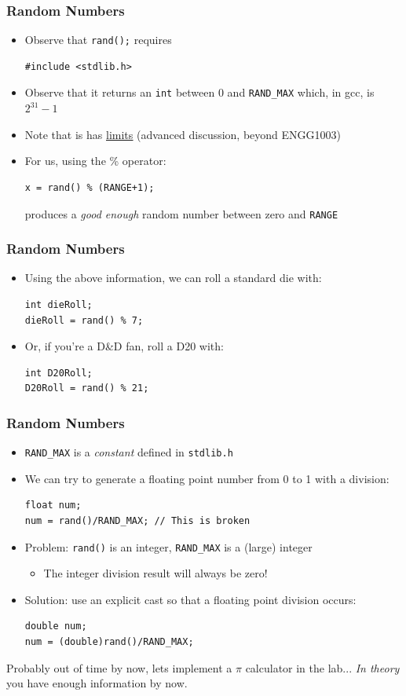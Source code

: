\documentclass[14pt]{beamer}
\begin{document}
\begin{frame}[fragile]
\frametitle{Random Numbers}
\begin{itemize}
\item Observe that \texttt{rand();} requires 
\begin{lstlisting}[style=CStyle]
#include <stdlib.h>
\end{lstlisting}
\item Observe that it returns an \texttt{int} between 0 and \texttt{RAND\_MAX} which, in gcc, is $2^{31}-1$
\item Note that is has \underline{\href{http://www.azillionmonkeys.com/qed/random.html}{limits}} (advanced discussion, beyond ENGG1003)
\item For us, using the \% operator:
\begin{lstlisting}[style=CStyle]
x = rand() % (RANGE+1);
\end{lstlisting}
produces a \textit{good enough} random number between zero and \texttt{RANGE}
\end{itemize}
\end{frame}

\begin{frame}[fragile]
\frametitle{Random Numbers}
\begin{itemize}
\item Using the above information, we can roll a standard die with:
\begin{lstlisting}[style=CStyle]
int dieRoll;
dieRoll = rand() % 7;
\end{lstlisting}
\item Or, if you're a D\&D fan, roll a D20 with:
\begin{lstlisting}[style=CStyle]
int D20Roll;
D20Roll = rand() % 21;
\end{lstlisting}
\end{itemize}
\end{frame}


\begin{frame}[fragile]
\frametitle{Random Numbers}
\begin{itemize}
\item \texttt{RAND\_MAX} is a \textit{constant} defined in \texttt{stdlib.h}
\item We can try to generate a floating point number from 0 to 1 with a division:
\begin{lstlisting}[style=CStyle]
float num;
num = rand()/RAND_MAX; // This is broken
\end{lstlisting}
\item Problem: \texttt{rand()} is an integer, \texttt{RAND\_MAX} is a (large) integer
	\begin{itemize}
		\item The integer division result will always be zero!
	\end{itemize}
\item Solution: use an explicit cast so that a floating point division occurs:
\begin{lstlisting}[style=CStyle]
double num;
num = (double)rand()/RAND_MAX;
\end{lstlisting}
\end{itemize}
\end{frame}

\begin{frame}
Probably out of time by now, lets implement a $\pi$ calculator in the lab... \textit{In theory} you have enough information by now.
\end{frame}
\end{document}
